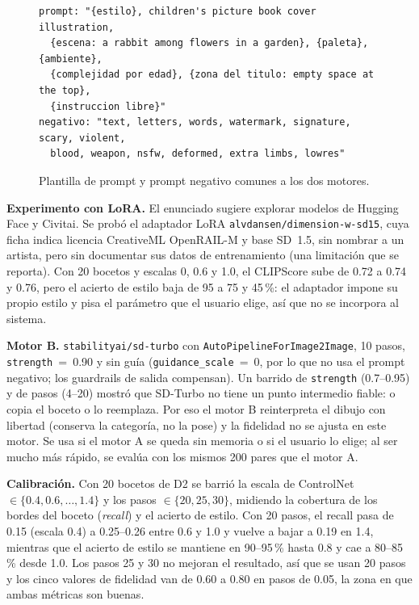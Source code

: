 \documentclass[10pt,a4paper,twocolumn]{article}
\begin{document}
\begin{figure}[t]
\begin{lstlisting}
prompt: "{estilo}, children's picture book cover illustration,
  {escena: a rabbit among flowers in a garden}, {paleta}, {ambiente},
  {complejidad por edad}, {zona del titulo: empty space at the top},
  {instruccion libre}"
negativo: "text, letters, words, watermark, signature, scary, violent,
  blood, weapon, nsfw, deformed, extra limbs, lowres"
\end{lstlisting}
\caption{Plantilla de prompt y prompt negativo comunes a los dos motores.}\label{fig:prompt}
\end{figure}
\textbf{Experimento con LoRA.} El enunciado sugiere explorar modelos de Hugging Face y Civitai. Se probó el adaptador LoRA \citep{hu2022} \texttt{alvdansen/dimension-w-sd15}, cuya ficha indica licencia CreativeML OpenRAIL-M y base SD~1.5, sin nombrar a un artista, pero sin documentar sus datos de entrenamiento (una limitación que se reporta). Con 20 bocetos y escalas 0, 0.6 y 1.0, el CLIPScore sube de 0.72 a 0.74 y 0.76, pero el acierto de estilo baja de 95 a 75 y 45\,\%: el adaptador impone su propio estilo y pisa el parámetro que el usuario elige, así que no se incorpora al sistema.

\textbf{Motor B.} \texttt{stabilityai/sd-turbo} con \texttt{AutoPipelineForImage2Image}, 10 pasos, \texttt{strength}~=~0.90 y sin guía (\texttt{guidance\_scale}~=~0, por lo que no usa el prompt negativo; los guardrails de salida compensan). Un barrido de \texttt{strength} (0.7--0.95) y de pasos (4--20) mostró que SD-Turbo no tiene un punto intermedio fiable: o copia el boceto o lo reemplaza. Por eso el motor B reinterpreta el dibujo con libertad (conserva la categoría, no la pose) y la fidelidad no se ajusta en este motor. Se usa si el motor A se queda sin memoria o si el usuario lo elige; al ser mucho más rápido, se evalúa con los mismos 200 pares que el motor A.

\textbf{Calibración.} Con 20 bocetos de D2 se barrió la escala de ControlNet $\in\{0.4,0.6,\dots,1.4\}$ y los pasos $\in\{20,25,30\}$, midiendo la cobertura de los bordes del boceto (\emph{recall}) y el acierto de estilo. Con 20 pasos, el recall pasa de 0.15 (escala 0.4) a 0.25--0.26 entre 0.6 y 1.0 y vuelve a bajar a 0.19 en 1.4, mientras que el acierto de estilo se mantiene en 90--95\,\% hasta 0.8 y cae a 80--85\,\% desde 1.0. Los pasos 25 y 30 no mejoran el resultado, así que se usan 20 pasos y los cinco valores de fidelidad van de 0.60 a 0.80 en pasos de 0.05, la zona en que ambas métricas son buenas.
\end{document}
